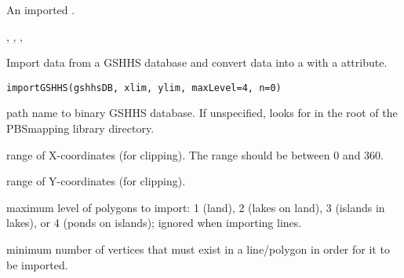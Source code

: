 \documentclass[letterpaper]{book}
\begin{document}
%
\begin{Value}
An imported .
\end{Value}
%
\begin{SeeAlso}\relax
{}, , , 
\end{SeeAlso}
%
\begin{Description}\relax
Import data from a GSHHS database and convert data into a 
with a  attribute.
\end{Description}
%
\begin{Usage}
\begin{verbatim}
importGSHHS(gshhsDB, xlim, ylim, maxLevel=4, n=0)
\end{verbatim}
\end{Usage}
%
\begin{Arguments}
\begin{ldescription}
\item[\code{gshhsDB}] path name to binary GSHHS database. If unspecified,
looks for  in the root of the PBSmapping library
directory.
\item[\code{xlim}] range of X-coordinates (for clipping).
The range should be between 0 and 360.
\item[\code{ylim}] range of Y-coordinates (for clipping).
\item[\code{maxLevel}] maximum level of polygons to import:
1 (land), 2 (lakes on land), 3 (islands in lakes), or 4 (ponds on
islands); ignored when importing lines.
\item[\code{n}] minimum number of vertices that must exist in a line/polygon
in order for it to be imported.
\end{ldescription}
\end{Arguments}
%
\end{document}
